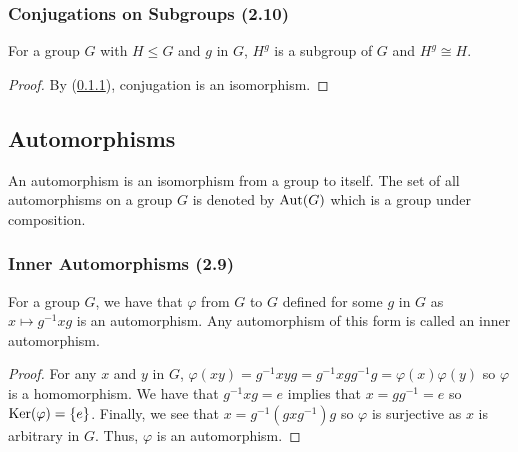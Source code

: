 \subsubsection{Conjugations on Subgroups (2.10)} \label{2.10}

For a group $G$ with $H \leq G$ and $g$ in $G$, $H^g$ is a subgroup of
$G$ and $H^g \cong H$.

\begin{proof}
    By (\ref{2.9}), conjugation is an isomorphism.
\end{proof}

\subsection{Automorphisms}

An automorphism is an isomorphism from a group to itself. The set of
all automorphisms on a group $G$ is denoted by $\operatorname{Aut}(G)$ which
is a group under composition.

\subsubsection{Inner Automorphisms (2.9)} \label{2.9}

For a group $G$, we have that $\varphi$ from $G$ to $G$ defined for some $g$ in $G$ 
as $x \mapsto g^{-1}xg$ is an automorphism. Any automorphism of this
form is called an inner automorphism.

\begin{proof}
    For any $x$ and $y$ in $G$, 
    $\varphi(xy) = g^{-1}xyg = g^{-1}xgg^{-1}g = \varphi(x)\varphi(y)$
    so $\varphi$ is a homomorphism. We have that 
    $g^{-1}xg = e$ implies that $x = gg^{-1} = e$ so 
    $\operatorname{Ker}(\varphi) = \{e\}$. Finally, we see that $x = g^{-1}(gxg^{-1})g$
    so $\varphi$ is surjective as $x$ is arbitrary in $G$. 
    Thus, $\varphi$ is an automorphism.
\end{proof}
